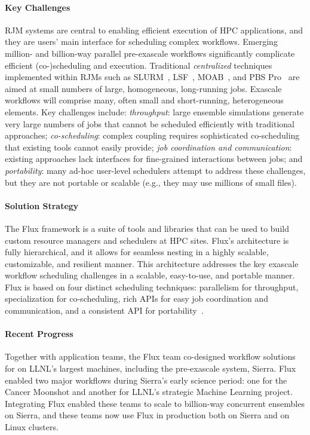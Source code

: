 \paragraph{Key Challenges}
RJM systems are central to enabling efficient execution of HPC
applications, and they are users' main interface for scheduling complex
workflows.
%
Emerging million- and billion-way parallel pre-exascale workflows
significantly complicate efficient (co-)scheduling and execution.
%
Traditional \emph{centralized} techniques implemented within RJMs such as
SLURM~\cite{SLURM}, LSF~\cite{LSF}, MOAB~\cite{MOAB}, and PBS
Pro~\cite{PBSPro} are aimed at small numbers of large, homogeneous,
long-running jobs.  Exascale workflows will comprise many, often small
and short-running, heterogeneous elements.
%
Key challenges include:
{\it throughput}:
      large ensemble simulations generate very large numbers
      of jobs that cannot be scheduled efficiently with traditional approaches;
{\it co-scheduling}: complex coupling requires
      sophisticated co-scheduling that existing tools cannot easily provide;
{\it job coordination and communication}:
      existing approaches lack interfaces for fine-grained interactions between
      jobs;
and {\it portability}:
      many ad-hoc user-level schedulers attempt to address these
      challenges, but they are not portable or scalable (e.g., they may use
      millions of small files).

\paragraph{Solution Strategy}
The Flux framework is a suite of tools and libraries that can be used to
build custom resource managers and schedulers at HPC sites.  Flux's
architecture is fully hierarchical, and it allows for seamless nesting in
a highly scalable, customizable, and resilient manner.  This architecture
addresses the key exascale workflow scheduling challenges in a scalable,
easy-to-use, and portable manner. Flux is based on four distinct
scheduling techniques: parallelism for throughput, specialization for
co-scheduling, rich APIs for easy job coordination and communication, and
a consistent API for portability~\cite{FluxSC18}.

\paragraph{Recent Progress}
Together with application teams, the Flux team co-designed workflow
solutions for on LLNL's largest machines, including the pre-exascale
system, Sierra.  Flux enabled two major workflows during Sierra's early
science period: one for the Cancer Moonshot and another for LLNL's
strategic Machine Learning project.  Integrating Flux enabled these teams
to scale to billion-way concurrent ensembles on Sierra, and these teams
now use Flux in production both on Sierra and on Linux clusters.

